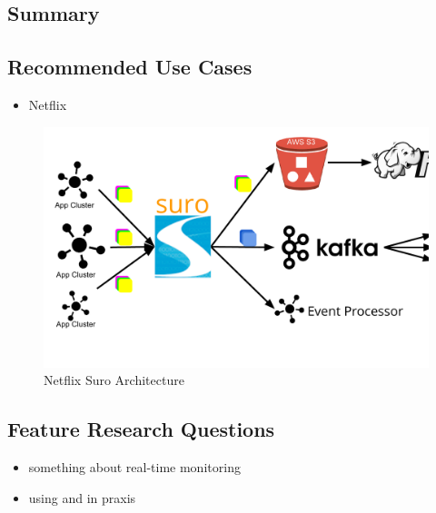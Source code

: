 \subsection{Summary}

\subsection{Recommended Use Cases}
\begin{itemize}
  \item Netflix
\end{itemize}

\begin{figure}[hbt]
  \centering
  \includegraphics[width=\linewidth,clip=true,trim=5mm 20mm 5mm 5mm]{images/NetflixSuro}
  \caption{Netflix Suro Architecture} %
  \label{fig:SuroArchitecture}
\end{figure}


\subsection{Feature Research Questions}
\begin{itemize}
  \item something about real-time monitoring
  \item using \chuk and \amb in praxis
\end{itemize}